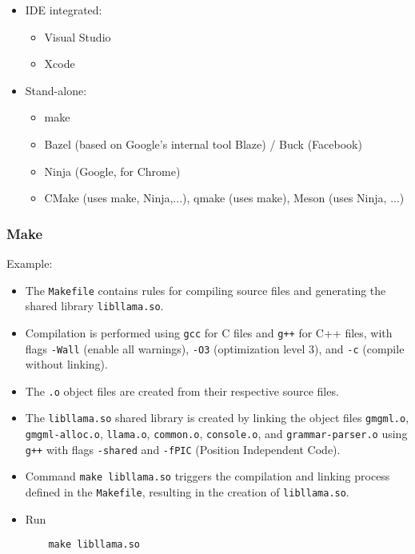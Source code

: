 \documentclass[12pt]{article}
\begin{document}
\begin{itemize}
    \item IDE integrated:
    \begin{itemize}
        \item Visual Studio
        \item Xcode
    \end{itemize}
    
    \item Stand-alone:
    \begin{itemize}
        \item make
        \item Bazel (based on Google's internal tool Blaze) / Buck (Facebook)
        \item Ninja (Google, for Chrome)
        \item CMake (uses make, Ninja,...), qmake (uses make), Meson (uses Ninja, ...)
    \end{itemize}
\end{itemize}

\subsubsection{Make}
Example:
\begin{itemize}
    \item The \texttt{Makefile} contains rules for compiling source files and generating the shared library \texttt{libllama.so}.
    \item Compilation is performed using \texttt{gcc} for C files and \texttt{g++} for C++ files, with flags \texttt{-Wall} (enable all warnings), \texttt{-O3} (optimization level 3), and \texttt{-c} (compile without linking).
    \item The \texttt{.o} object files are created from their respective source files.
    \item The \texttt{libllama.so} shared library is created by linking the object files \texttt{gmgml.o}, \texttt{gmgml-alloc.o}, \texttt{llama.o}, \texttt{common.o}, \texttt{console.o}, and \texttt{grammar-parser.o} using \texttt{g++} with flags \texttt{-shared} and \texttt{-fPIC} (Position Independent Code).
    \item Command \texttt{make libllama.so} triggers the compilation and linking process defined in the \texttt{Makefile}, resulting in the creation of \texttt{libllama.so}.
    \item Run
    \begin{verbatim}
    make libllama.so
    \end{verbatim}
\end{itemize}
\end{document}
